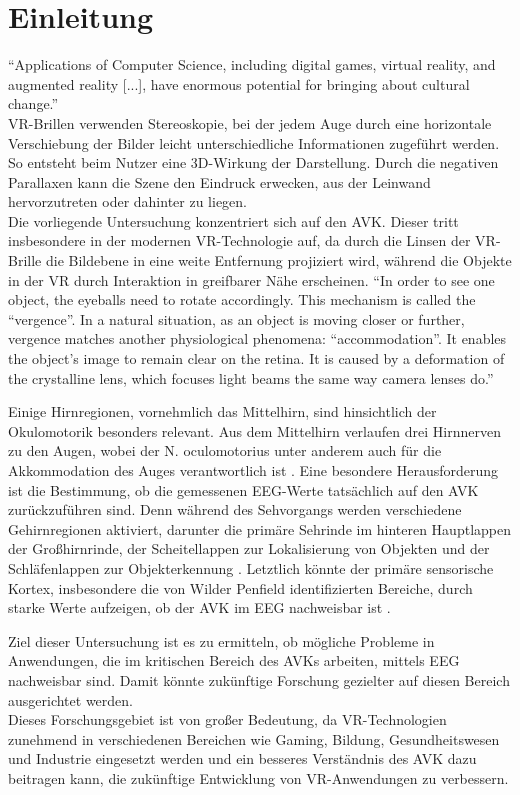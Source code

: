 \documentclass[conference]{IEEEtran}
\begin{document}
\section{Einleitung}
“Applications of Computer Science, including digital games, virtual reality, and augmented reality [...], have enormous potential for bringing about cultural change.”\cite{b1}\\
VR-Brillen verwenden Stereoskopie, bei der jedem Auge durch eine horizontale Verschiebung der Bilder leicht unterschiedliche Informationen zugeführt werden. So entsteht beim Nutzer eine 3D-Wirkung der Darstellung. Durch die negativen Parallaxen kann die Szene den Eindruck erwecken, aus der Leinwand hervorzutreten oder dahinter zu liegen.\cite{b2}\\
Die vorliegende Untersuchung konzentriert sich auf den AVK. Dieser tritt insbesondere in der modernen VR-Technologie auf, da durch die Linsen der VR-Brille die Bildebene in eine weite Entfernung projiziert wird, während die Objekte in der VR durch Interaktion in greifbarer Nähe erscheinen.
“In order to see one object, the eyeballs need to rotate accordingly. This mechanism is called the “vergence”. In a natural situation, as an object is moving closer or further, vergence matches another physiological phenomena: “accommodation”. It enables the object’s image to remain clear on the retina. It is caused by a deformation of the crystalline lens, which focuses light beams the same way camera lenses do.”\cite{b3}

Einige Hirnregionen, vornehmlich das Mittelhirn, sind hinsichtlich der Okulomotorik besonders relevant. Aus dem Mittelhirn verlaufen drei Hirnnerven zu den Augen, wobei der N. oculomotorius unter anderem auch für die Akkommodation des Auges verantwortlich ist \cite{b4}. Eine besondere Herausforderung ist die Bestimmung, ob die gemessenen EEG-Werte tatsächlich auf den AVK zurückzuführen sind. Denn während des Sehvorgangs werden verschiedene Gehirnregionen aktiviert, darunter die primäre Sehrinde im hinteren Hauptlappen der Großhirnrinde, der Scheitellappen zur Lokalisierung von Objekten und der Schläfenlappen zur Objekterkennung \cite{b5}. Letztlich könnte der primäre sensorische Kortex, insbesondere die von Wilder Penfield identifizierten Bereiche, durch starke Werte aufzeigen, ob der AVK im EEG nachweisbar ist \cite{b6}.

Ziel dieser Untersuchung ist es zu ermitteln, ob mögliche Probleme in Anwendungen, die im kritischen Bereich des AVKs arbeiten, mittels EEG nachweisbar sind. Damit könnte zukünftige Forschung gezielter auf diesen Bereich ausgerichtet werden.\\
Dieses Forschungsgebiet ist von großer Bedeutung, da VR-Technologien zunehmend in verschiedenen Bereichen wie Gaming, Bildung, Gesundheitswesen und Industrie eingesetzt werden und ein besseres Verständnis des AVK dazu beitragen kann, die zukünftige Entwicklung von VR-Anwendungen zu verbessern.
\end{document}
